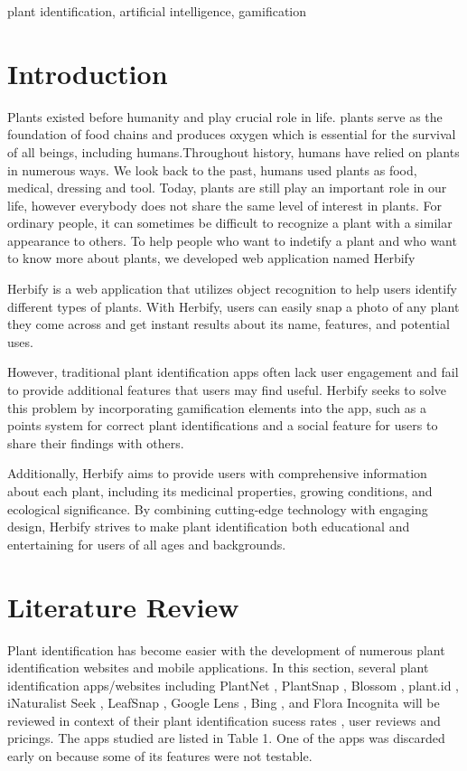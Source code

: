 \documentclass[conference]{IEEEtran}
\begin{document}
\begin{IEEEkeywords}
plant identification, artificial intelligence, gamification
\end{IEEEkeywords}

\section{Introduction}
Plants existed before humanity and play crucial role in life. plants serve as the foundation of food chains and produces oxygen which is essential for the survival of all beings, including humans.Throughout history, humans have relied on plants in numerous ways. We look back to the past, humans used plants as food, medical, dressing and tool. Today, plants are still play an important role in our life, however everybody does not share the same level of interest in plants. For ordinary people, it can sometimes be difficult to recognize a plant with a similar appearance to others. To help people who want to indetify a plant and who want to know more about plants, we developed web application named Herbify

Herbify is a web application that utilizes object recognition to help users identify different types of plants. With Herbify, users can easily snap a photo of any plant they come across and get instant results about its name, features, and potential uses.

However, traditional plant identification apps often lack user engagement and fail to provide additional features that users may find useful. Herbify seeks to solve this problem by incorporating gamification elements into the app, such as a points system for correct plant identifications and a social feature for users to share their findings with others.

Additionally, Herbify aims to provide users with comprehensive information about each plant, including its medicinal properties, growing conditions, and ecological significance. By combining cutting-edge technology with engaging design, Herbify strives to make plant identification both educational and entertaining for users of all ages and backgrounds.

\section{Literature Review}
Plant identification has become easier with the development of numerous plant identification websites and mobile applications.
In this section, several plant identification apps/websites including PlantNet \cite{PlantNet}, PlantSnap \cite{PlantSnapMobileApp} \cite{PlantSnapWebsite}, Blossom \cite{GooglePlayBlossom}, plant.id \cite{PlantId}, iNaturalist Seek \cite{iNaturalist}, LeafSnap \cite{LeafSnap}, Google Lens \cite{GoogleLens}, Bing \cite{Bing}, and Flora Incognita \cite{FloraIncognita} will be reviewed in context of their plant identification sucess rates , user reviews and pricings.
 The apps studied are listed in Table 1. One of the apps was discarded early on because some of its features were not testable.
\end{document}
